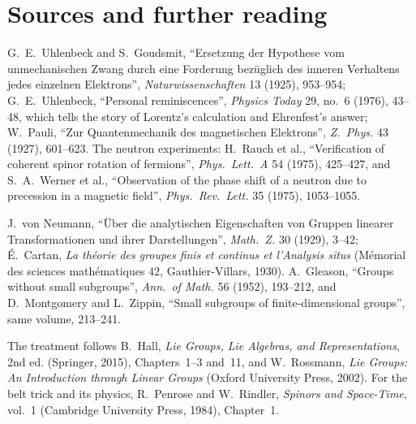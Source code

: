 \section*{Sources and further reading}

G.~E.~Uhlenbeck and S.~Goudsmit, ``Ersetzung der Hypothese vom unmechanischen Zwang durch eine Forderung bez\"uglich des inneren Verhaltens jedes einzelnen Elektrons'', \emph{Naturwissenschaften}
13 (1925), 953--954; G.~E.~Uhlenbeck, ``Personal reminiscences'', \emph{Physics Today} 29, no.~6 (1976), 43--48, which tells the story of Lorentz's calculation and Ehrenfest's answer; W.~Pauli, ``Zur Quantenmechanik
des magnetischen Elektrons'', \emph{Z.\ Phys.} 43 (1927), 601--623. The neutron experiments: H.~Rauch et al., ``Verification of coherent spinor rotation of fermions'', \emph{Phys.\ Lett.\ A} 54 (1975), 425--427, and
S.~A.~Werner et al., ``Observation of the phase shift of a neutron due to precession in a magnetic field'', \emph{Phys.\ Rev.\ Lett.} 35 (1975), 1053--1055.

J.~von Neumann, ``\"Uber die analytischen Eigenschaften von Gruppen linearer Transformationen und ihrer Darstellungen'', \emph{Math.\ Z.} 30 (1929), 3--42; \'E.~Cartan, \emph{La th\'eorie des groupes finis et
continus et l'Analysis situs} (M\'emorial des sciences math\'ematiques 42, Gauthier-Villars, 1930). A.~Gleason, ``Groups without small subgroups'', \emph{Ann.\ of Math.} 56 (1952), 193--212, and D.~Montgomery and
L.~Zippin, ``Small subgroups of finite-dimensional groups'', same volume, 213--241.

The treatment follows B.~Hall, \emph{Lie Groups, Lie Algebras, and Representations}, 2nd ed. (Springer, 2015), Chapters~1--3 and~11, and W.~Rossmann, \emph{Lie Groups: An Introduction through Linear Groups}
(Oxford University Press, 2002). For the belt trick and its physics, R.~Penrose and W.~Rindler, \emph{Spinors and Space-Time}, vol.~1 (Cambridge University Press, 1984), Chapter~1.
